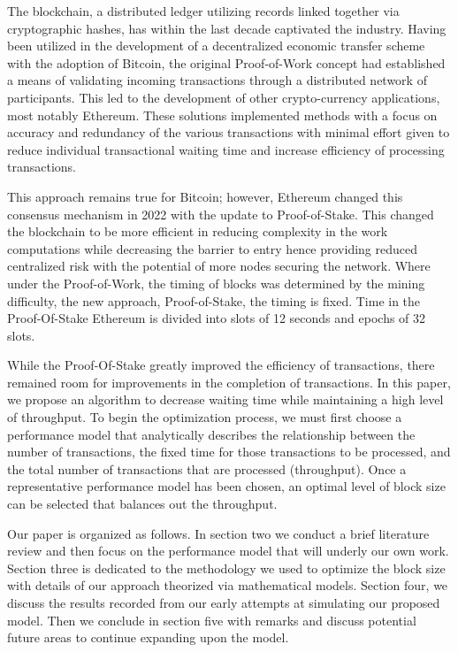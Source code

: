 \documentclass[conference]{IEEEtran}
\begin{document}
The blockchain, a distributed ledger utilizing records linked together via cryptographic hashes, has within 
the last decade captivated the industry. Having been utilized in the development of a decentralized economic 
transfer scheme with the adoption of Bitcoin, the original Proof-of-Work concept had established a means of
validating incoming transactions through a distributed network of participants. This led to the development 
of other crypto-currency applications, most notably Ethereum. These solutions implemented methods with a
focus on accuracy and redundancy of the various transactions with minimal effort given to reduce individual
transactional waiting time and increase efficiency of processing transactions.

This approach remains true for Bitcoin; however, Ethereum changed this consensus mechanism in 2022 with 
the update to Proof-of-Stake. This changed the blockchain to be more efficient in reducing complexity in the
work computations while decreasing the barrier to entry hence providing reduced centralized risk with the 
potential of more nodes securing the network. Where under the Proof-of-Work, the timing of blocks was 
determined by the mining difficulty, the new approach, Proof-of-Stake, the timing is fixed. Time in the 
Proof-Of-Stake Ethereum is divided into slots of 12 seconds and epochs of 32 slots.

While the Proof-Of-Stake greatly improved the efficiency of transactions, there remained room for 
improvements in the completion of transactions. In this paper, we propose an algorithm to 
decrease waiting time while maintaining a high level of throughput. To begin the optimization process, we
must first choose a performance model that analytically describes the relationship between the number 
of transactions, the fixed time for those transactions to be processed, and the total number of transactions
that are processed (throughput). Once a representative performance model has been chosen, an optimal
level of block size can be selected that balances out the throughput. 

Our paper is organized as follows. In section two we conduct a brief literature review and then focus on the
performance model that will underly our own work. Section three is dedicated to the methodology we used to
optimize the block size with details of our approach theorized via mathematical models. Section four, we 
discuss the results recorded from our early attempts at simulating our proposed model. Then we conclude in
section five with remarks and discuss potential future areas to continue expanding upon the model. 
\end{document}
